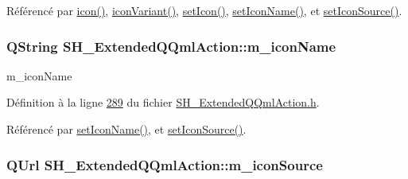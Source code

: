 Référencé par \hyperlink{classSH__ExtendedQQmlAction_abd41fe1b86e46d46cbf29d22303cd5e4}{icon()}, \hyperlink{classSH__ExtendedQQmlAction_a9cfb776ea62b4f0826765adb96b51a0c}{icon\-Variant()}, \hyperlink{classSH__ExtendedQQmlAction_ab000bcb2ecb4ba9e47834daf5c2e95c3}{set\-Icon()}, \hyperlink{classSH__ExtendedQQmlAction_abf2bb83a227c27c4d71f1b2670dcb3b4}{set\-Icon\-Name()}, et \hyperlink{classSH__ExtendedQQmlAction_a703b29eb866cdc4d739e3f22ada92fb6}{set\-Icon\-Source()}.

\hypertarget{classSH__ExtendedQQmlAction_a3375d1504e5ec862ed05500bf529d95c}{
\subsubsection[{m\-\_\-icon\-Name}]{\setlength{\rightskip}{0pt plus 5cm}Q\-String S\-H\-\_\-\-Extended\-Q\-Qml\-Action\-::m\-\_\-icon\-Name\hspace{0.3cm}{\ttfamily [private]}}}\label{classSH__ExtendedQQmlAction_a3375d1504e5ec862ed05500bf529d95c}


m\-\_\-icon\-Name 



Définition à la ligne \hyperlink{SH__ExtendedQQmlAction_8h_source_l00289}{289} du fichier \hyperlink{SH__ExtendedQQmlAction_8h_source}{S\-H\-\_\-\-Extended\-Q\-Qml\-Action.\-h}.



Référencé par \hyperlink{classSH__ExtendedQQmlAction_abf2bb83a227c27c4d71f1b2670dcb3b4}{set\-Icon\-Name()}, et \hyperlink{classSH__ExtendedQQmlAction_a703b29eb866cdc4d739e3f22ada92fb6}{set\-Icon\-Source()}.

\hypertarget{classSH__ExtendedQQmlAction_a61c8633eab1fa3b69752074220e785fc}{
\subsubsection[{m\-\_\-icon\-Source}]{\setlength{\rightskip}{0pt plus 5cm}Q\-Url S\-H\-\_\-\-Extended\-Q\-Qml\-Action\-::m\-\_\-icon\-Source\hspace{0.3cm}{\ttfamily [private]}}}\label{classSH__ExtendedQQmlAction_a61c8633eab1fa3b69752074220e785fc}


